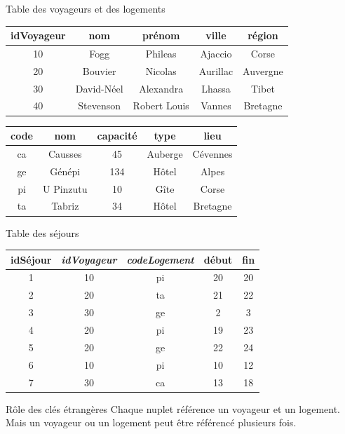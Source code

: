 \begin{frame}[fragile]{Table des voyageurs et des logements}

\begin{tabular}{c|c|c|c|c}
\textbf{idVoyageur} & \textbf{nom} & \textbf{prénom} & \textbf{ville} & \textbf{région}\\ \hline 
10 & Fogg & Phileas & Ajaccio & Corse\\ \hline 
20 & Bouvier & Nicolas & Aurillac & Auvergne\\ \hline 
30 & David-Néel & Alexandra & Lhassa & Tibet\\ \hline 
40 & Stevenson & Robert Louis & Vannes & Bretagne\\ \hline 
\end{tabular}

\vfill

\begin{tabular}{c|c|c|c|c}
\textbf{code} & \textbf{nom} & \textbf{capacité} & \textbf{type} & \textbf{lieu}\\ \hline 
ca & Causses & 45 & Auberge & Cévennes\\ \hline 
ge & Génépi & 134 & Hôtel & Alpes\\ \hline 
pi & U Pinzutu & 10 & Gîte & Corse\\ \hline 
ta & Tabriz & 34 & Hôtel & Bretagne\\ \hline 
\end{tabular}
\end{frame}


\begin{frame}[fragile]{Table des séjours}

\begin{center}
\begin{tabular}{c|c|c|c|c}
\textbf{idSéjour} & \textbf{\textit{idVoyageur}} & \textbf{\textit{codeLogement}} & \textbf{début} & \textbf{fin}\\ \hline 
1 & 10 & pi & 20 & 20\\ \hline 
2 & 20 & ta & 21 & 22\\ \hline 
3 & 30 & ge & 2 & 3\\ \hline 
4 & 20 & pi & 19 & 23\\ \hline 
5 & 20 & ge & 22 & 24\\ \hline 
6 & 10 & pi & 10 & 12\\ \hline 
7 & 30 & ca & 13 & 18\\ \hline 
\end{tabular}
\end{center}

\vfill

\begin{blocgauche}
\begin{remblock}{Rôle des clés étrangères}
Chaque nuplet référence \alert{un} voyageur et \alert{un} logement.
Mais un voyageur ou un logement peut être
référencé plusieurs fois.
\end{remblock}
\end{blocgauche}

\end{frame}



